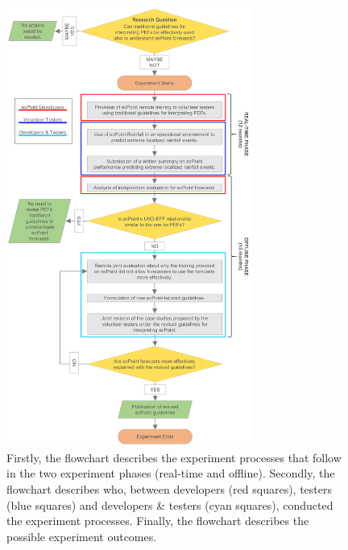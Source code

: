 \documentclass[twocol]{ametsocV5} %
\begin{document}
\begin{figure}
\centerline{\includegraphics[width=19pc]{manuscript/Figures/FlowChart.png}}
\caption{Firstly, the flowchart describes the experiment processes that follow in the two experiment phases (real-time and offline). Secondly, the flowchart describes who, between developers (red squares), testers (blue squares) and developers & testers (cyan squares), conducted the experiment processes. Finally, the flowchart describes the possible experiment outcomes.}
\label{FlowChart}
\end{figure}
\end{document}
